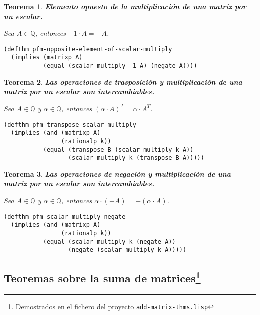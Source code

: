\documentclass[a4paper,10pt]{article}
\newcommand{\Q}[1]{#1 \in \mathbb{Q}}
\newtheorem{teor}{{Teorema}}
\begin{document}
\begin{teor} \textbf{Elemento opuesto de la multiplicación de una matriz por un escalar.}\vspace{8pt}\par
Sea $\Q{A}$, entonces $-1\cdot A = -A$.
\end{teor}

\begin{lstlisting}[language=clips]
(defthm pfm-opposite-element-of-scalar-multiply
  (implies (matrixp A)
           (equal (scalar-multiply -1 A) (negate A))))
\end{lstlisting}

\par \vspace{16pt}

\begin{teor} \textbf{Las operaciones de trasposición y multiplicación de una matriz por un escalar son intercambiables.}\vspace{8pt}\par
Sea $\Q{A}$ y $\Q{\alpha}$, entonces $(\alpha\cdot A)^T = \alpha\cdot A^T$.
\end{teor}

\begin{lstlisting}[language=clips]
(defthm pfm-transpose-scalar-multiply
  (implies (and (matrixp A)
                (rationalp k))
           (equal (transpose B (scalar-multiply k A))
                  (scalar-multiply k (transpose B A)))))
\end{lstlisting}

\par \vspace{16pt}

\begin{teor} \textbf{Las operaciones de negación y multiplicación de una matriz por un escalar son intercambiables.}\vspace{8pt}\par
Sea $\Q{A}$ y $\Q{\alpha}$, entonces $\alpha\cdot (-A) = -(\alpha\cdot A)$.
\end{teor}

\begin{lstlisting}[language=clips]
(defthm pfm-scalar-multiply-negate
  (implies (and (matrixp A)
                (rationalp k))
           (equal (scalar-multiply k (negate A))
                  (negate (scalar-multiply k A)))))
\end{lstlisting}

\vspace{12pt}
\subsection[Teoremas sobre la suma de matrices]{Teoremas sobre la suma de matrices\footnote{Demostrados en el fichero del proyecto \texttt{add-matrix-thms.lisp}}}
\vspace{10pt}
\end{document}
